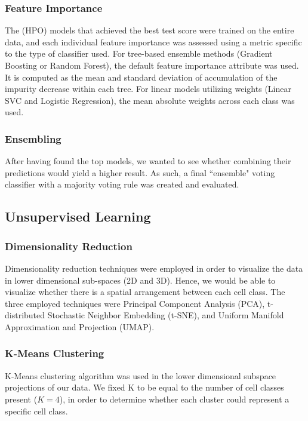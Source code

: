 \documentclass{IEEEtran}
\begin{document}
\subsubsection{Feature Importance}
The (HPO) models that achieved the best test score were trained on the entire data, and each individual feature importance was assessed using a metric specific to the type of classifier used. For tree-based ensemble methods (Gradient Boosting or Random Forest), the default feature importance attribute was used. It is computed as the mean and standard deviation of accumulation of the impurity decrease within each tree. For linear models utilizing weights (Linear SVC and Logistic Regression), the mean absolute weights across each class was used.

\subsubsection{Ensembling}
After having found the top models, we wanted to see whether combining their predictions would yield a higher result. As such, a final ``ensemble" voting classifier with a majority voting rule was created and evaluated.

\subsection{Unsupervised Learning}

\subsubsection{Dimensionality Reduction}
Dimensionality reduction techniques were employed in order to visualize the data in lower dimensional sub-spaces (2D and 3D). Hence, we would be able to visualize whether there is a spatial arrangement between each cell class. The three employed techniques were Principal Component Analysis (PCA), t-distributed Stochastic Neighbor Embedding (t-SNE), and Uniform Manifold Approximation and Projection (UMAP).

\subsubsection{K-Means Clustering}
K-Means clustering algorithm was used in the lower dimensional subspace projections of our data. We fixed K to be equal to the number of cell classes present ($K=4$), in order to determine whether each cluster could represent a specific cell class.
\end{document}
